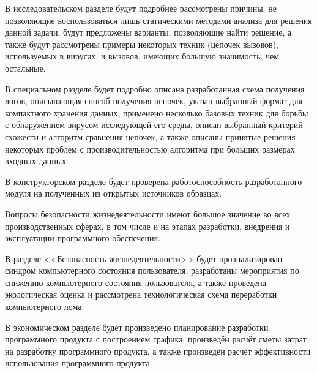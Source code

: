 В исследовательском разделе будут подробнее рассмотрены причины, не позволяющие воспользоваться лишь статическими методами анализа для решения данной задачи, будут предложены варианты, позволяющие найти решение, а также будут рассмотрены примеры некоторых техник (цепочек вызовов), используемых в вирусах, и вызовов, имеющих большую значимость, чем остальные.

В специальном разделе будет подробно описана разработанная схема получения логов, описывающая способ получения цепочек, указан выбранный формат для компактного хранения данных, применено несколько базовых техник для борьбы с обнаружением вирусом исследующей его среды, описан выбранный критерий схожести и алгоритм сравнения цепочек, а также описаны принятые решения некоторых проблем с производительностью алгоритма при больших размерах входных данных.

В конструкторском разделе будет проверена работоспособность разработанного модуля на полученных из открытых источников образцах.

Вопросы безопасности жизнедеятельности имеют большое значение во всех производственных сферах, в том числе и на этапах разработки, внедрения и эксплуатации программного обеспечения.

В разделе <<Безопасность жизнедеятельности>> будет проанализирован синдром компьютерного состояния пользователя, разработаны мероприятия по снижению компьютерного состояния пользователя, а также проведена экологическая оценка и рассмотрена технологическая схема переработки компьютерного лома.

В экономическом разделе будет произведено планирование разработки программного продукта с построением графика, произведён расчёт сметы затрат на разработку программного продукта, а также произведён расчёт эффективности использования программного продукта.
